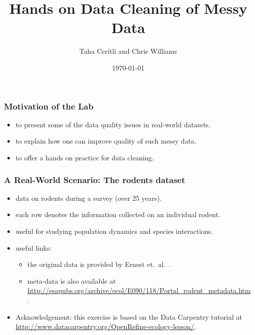 \documentclass{beamer}					%
\title{Hands on Data Cleaning of Messy Data}	%
\author{Taha Ceritli and Chris Williams}
\institute{School of Informatics, University of Edinburgh}
\date{\today}									%
\begin{document}
\begin{frame}
  \titlepage
\end{frame}
   

 \begin{frame}[c]
  \frametitle{Motivation of the Lab}
 \begin{itemize}
 \item to present some of the data quality issues in real-world datasets.
 \item to explain how one can improve quality of such messy data.
 \item to offer a hands on practice for data cleaning.
 \end{itemize}
 \end{frame}
   
 \begin{frame}[c]
 \frametitle{A Real-World Scenario: The rodents dataset}
 \begin{itemize}
 \item data on rodents during a survey (over 25 years).
 \item each row denotes the information collected on an individual rodent.
 \item useful for studying population dynamics and species interactions.
 \item useful links:
 \begin{itemize}
 \item the original data is provided by Ernest et.\ al.\ \cite{Ernest2018}. 
 \item meta-data is also available at \footnotesize{\url{http://esapubs.org/archive/ecol/E090/118/Portal\_rodent\_metadata.htm}}.
  \end{itemize}
 \item Acknowledgement: this exercise is based on the Data Carpentry 
tutorial at
\footnotesize{\url{http://www.datacarpentry.org/OpenRefine-ecology-lesson/}}.
 \end{itemize}
 \end{frame}
 
\end{document}

